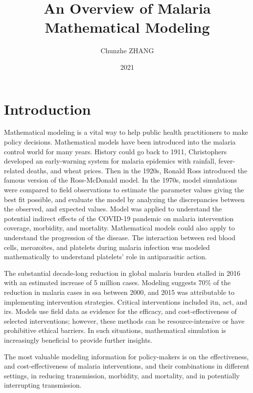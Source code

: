 \documentclass[a4paper, 12pt, twoside]{report}
\title{An Overview of Malaria Mathematical Modeling}
\author{Chunzhe ZHANG}
\date{2021}
\begin{document}
\begin{titlepage}
	\maketitle
\end{titlepage}

\tableofcontents

\printglossaries
\printnomenclature

\newpage
\chapter{Introduction}
Mathematical modeling is a vital way to help public health practitioners to make policy decisions.
Mathematical models have been introduced into the malaria control world for many years.
History could go back to 1911, Christophers\cite{christophers1911epidemic} developed an early-warning system for malaria epidemics with rainfall, fever-related deaths, and wheat prices.
Then in the 1920s, Ronald Ross introduced the famous version of the Ross-McDonald model.
In the 1970s, model simulations were compared to field observations to estimate the parameter values giving the best fit possible, and evaluate the model by analyzing the discrepancies between the observed, and expected values\cite{dietz1974}.
Model\cite{Weiss2020e} was applied to understand the potential indirect effects of the COVID-19 pandemic on malaria intervention coverage, morbidity, and mortality.
Mathematical models could also apply to understand the progression of the disease.
The interaction between red blood cells, merozoites, and platelets during malaria infection was modeled mathematically\cite{Alves2021} to understand platelets' role in antiparasitic action.

The substantial decade-long reduction in global malaria burden stalled in 2016 with an estimated increase of 5 million cases.
Modeling suggests 70\% of the reduction in malaria cases in \gls{ssa} between 2000, and 2015 was attributable to implementing intervention strategies.
Critical interventions included \gls{itn}, \gls{act}, and \gls{irs}.
Models use field data as evidence for the efficacy, and cost-effectiveness of selected interventions; however, these methods can be resource-intensive or have prohibitive ethical barriers.
In such situations, mathematical simulation is increasingly beneficial to provide further insights.

The most valuable modeling information for policy-makers is on the effectiveness, and cost-effectiveness of malaria interventions, and their combinations in different settings, in reducing transmission, morbidity, and mortality, and in potentially interrupting transmission.
\end{document}

